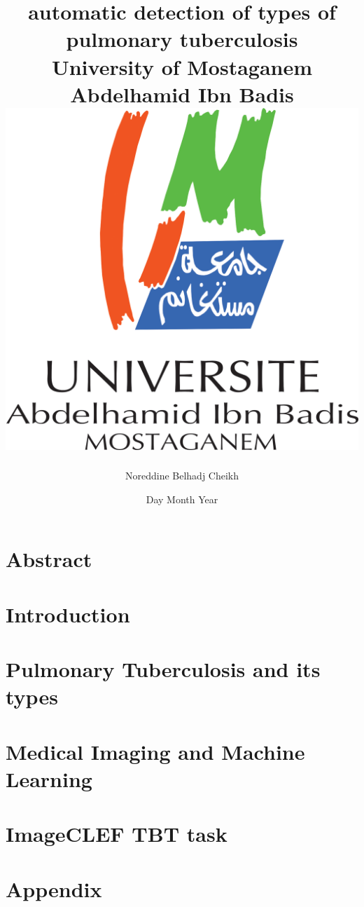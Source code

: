 \documentclass[12pt,twoside]{report}
\title{
{automatic detection of types of pulmonary tuberculosis}\\
{\large University of Mostaganem Abdelhamid Ibn Badis}\\
{\includegraphics{university.png}}
}
\author{Noreddine Belhadj Cheikh}
\date{Day Month Year}
\begin{document}
 \maketitle
\chapter*{Abstract}


\tableofcontents
\chapter*{Introduction}

\chapter{Pulmonary Tuberculosis and its types}

\chapter{Medical Imaging and Machine Learning}

\chapter{ImageCLEF TBT task}

\newpage
\appendix
\chapter{Appendix}

\printacronyms[include-classes=abbrev,name=Abbreviations]
\newpage
 

\end{document}
